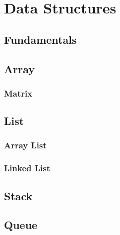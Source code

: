 \chapter{Data Structures}
\label{ch:datastructures}


\section{Fundamentals}


\section{Array}


\subsection{Matrix}


\section{List}


\subsection{Array List}


\subsection{Linked List}


\section{Stack}


\section{Queue}

